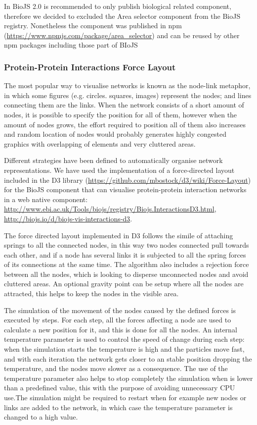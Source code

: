 In BioJS 2.0 is recommended to only publish biological related component, therefore we decided to excluded the Area selector component from the BioJS registry. Nonetheless the component was published in npm (\url{https://www.npmjs.com/package/area_selector}) and can be reused by other npm packages including those part of BIoJS
 
\subsubsection{Protein-Protein Interactions Force Layout} \label{subsubsec:ppi_biojs}
The most popular way to visualise networks is known as the node-link metaphor, in which some figures (e.g. circles. squares, images) represent the nodes; and lines connecting them are the links. When the network consists of a short amount of nodes, it is possible to specify the position for all of them, however when the amount of nodes grows, the effort required to position all of them also increases and random location of nodes would probably generates highly congested graphics with overlapping of elements and very cluttered areas.

Different strategies have been defined to automatically organise network representations. We have used the implementation of a force-directed layout included in the D3 library (\url{https://github.com/mbostock/d3/wiki/Force-Layout}) \cite{BOS2011} for the BioJS component that can visualise protein-protein interaction networks in a web native component:  \url{http://www.ebi.ac.uk/Tools/biojs/registry/Biojs.InteractionsD3.html}, \url{http://biojs.io/d/biojs-vis-interactions-d3}.

The force directed layout implemented in D3 follows the simile of attaching springs to all the connected nodes, in this way  two nodes connected pull towards each other, and if a node has several links it is subjected to all the spring forces of its connections at the same time. The algorithm also includes a rejection force between all the nodes, which is looking to disperse unconnected nodes and avoid cluttered areas. An optional gravity point can be setup where all the nodes are attracted, this helps to keep the nodes in the visible area. 

The simulation of the movement of the nodes caused by the defined forces is executed by steps. For each step, all the forces affecting a node are used to calculate a new position for it, and this is done for all the nodes. An internal temperature parameter is used to control the speed of change during each step: when the simulation starts the temperature is high and the particles move fast, and with each iteration the network gets closer to an stable position dropping the temperature, and the nodes move slower as a consequence. The use of the temperature parameter also helps to stop completely the simulation when is lower than a predefined value, this with the purpose of avoiding unnecessary CPU use.The simulation might be required to restart when for example new nodes or links are added to the network, in which case the temperature parameter is changed to a high value.


